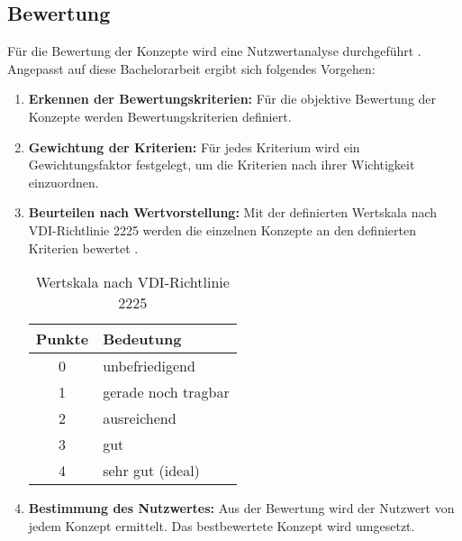 \subsection{Bewertung}
Für die Bewertung der Konzepte wird eine Nutzwertanalyse durchgeführt \cite{naefe}. Angepasst auf diese Bachelorarbeit ergibt sich folgendes Vorgehen:

\begin{enumerate}
	\item \textbf{Erkennen der Bewertungskriterien:} Für die objektive Bewertung der Konzepte werden Bewertungskriterien definiert.
	
	\item \textbf{Gewichtung der Kriterien:} Für jedes Kriterium wird ein Gewichtungsfaktor festgelegt, um die Kriterien nach ihrer Wichtigkeit einzuordnen.
	
	\item \textbf{Beurteilen nach Wertvorstellung:} Mit der definierten Wertskala nach VDI-Richtlinie 2225 werden die einzelnen Konzepte an den definierten Kriterien bewertet \cite{vdi2225}.

\begin{table}[H]
	\begin{tabular}{|c|l|}
		\hline 
		\textbf{Punkte} & \textbf{Bedeutung} \\ 
		\hline 
		0 & unbefriedigend \\ 
		\hline 
		1 & gerade noch tragbar \\ 
		\hline 
		2 & ausreichend \\ 
		\hline 
		3 & gut \\ 
		\hline 
		4 & sehr gut (ideal) \\ 
		\hline 
	\end{tabular} 
	\caption{Wertskala nach VDI-Richtlinie 2225}
	\label{tab:wertskala}
\end{table}	
	
	
	\item \textbf{Bestimmung des Nutzwertes:} Aus der Bewertung wird der Nutzwert von jedem Konzept ermittelt. Das bestbewertete Konzept wird umgesetzt.
\end{enumerate}

